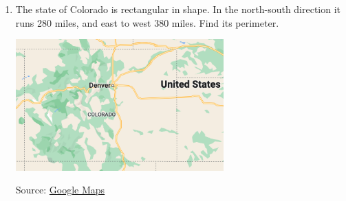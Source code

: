 \begin{enumerate}
\item The state of Colorado is rectangular in shape. In the north-south direction it runs 280 miles, and east to west 380 miles. Find its perimeter.
  \begin{flushright}
    \includegraphics[width=8cm]{../graphics/Colorado.png} \par
    Source: \href{https://www.google.com/maps/@38,-105,6z/}{Google Maps}
  \end{flushright}



\end{enumerate}
